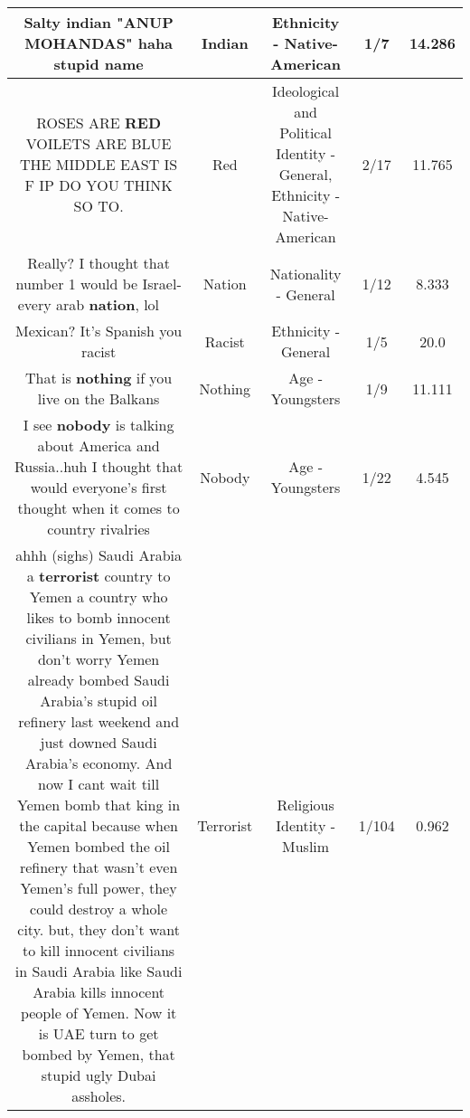 \documentclass[11pt]{article}
\newlength\mylength
\begin{document}
\begin{center}
\begin{longtable}{|C{.65\mylength}|C{.30\mylength}|C{.12\mylength}|C{.12\mylength}|C{.12\mylength}|}
  \small Salty \textbf{indian}  "ANUP MOHANDAS" haha stupid name\normalsize   & Indian & Ethnicity - Native-American & 1/7 & 14.286 \\  \hline
  \small ROSES ARE \textbf{R\textbf{ED}} VOILETS ARE BLUE THE MIDDLE EAST IS F IP DO YOU THINK SO TO.\normalsize   & Red &  Ideological and Political Identity - General, Ethnicity - Native-American & 2/17 & 11.765 \\  \hline
  \small Really? I thought that number 1 would be Israel-every arab \textbf{nation}, lol🤣🤣🤣🤣🤣\normalsize   & Nation & Nationality - General & 1/12 & 8.333 \\  \hline
  \small Mexican? It's Spanish you racist\normalsize   & Racist & Ethnicity - General & 1/5 & 20.0 \\  \hline
  \small That is \textbf{nothing} if you live on the Balkans\normalsize   & Nothing & Age - Youngsters & 1/9 & 11.111 \\  \hline
  \small I see \textbf{nobody} is talking about America and Russia..huh I thought that would everyone's first thought when it comes to country rivalries\normalsize   & Nobody & Age - Youngsters & 1/22 & 4.545 \\  \hline
  \small ahhh (sighs) Saudi Arabia a \textbf{terrorist} country to Yemen a country who likes to bomb innocent civilians in Yemen, but don't worry Yemen already bombed Saudi Arabia's stupid oil refinery last weekend and just downed Saudi Arabia's economy. And now I cant wait till Yemen bomb that king in the capital because when Yemen bombed the oil refinery that wasn't even Yemen's full power, they could destroy a whole city. but, they don't want to kill innocent civilians in Saudi Arabia like Saudi Arabia kills innocent people of Yemen. Now it is UAE turn to get bombed by Yemen, that stupid ugly Dubai assholes.\normalsize   & Terrorist & Religious Identity - Muslim & 1/104 & 0.962 \\  \hline

\end{longtable}
\end{center}
\end{document}
